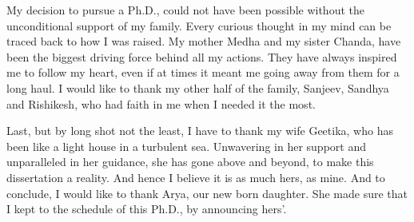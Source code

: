 \begin{acknowledgements}
My decision to pursue a Ph.D., could not have been possible without the unconditional support of my family. Every curious thought in my mind can be traced back to how I was raised. My mother Medha and my sister Chanda, have been the biggest driving force behind all my actions. They have always inspired me to follow my heart, even if at times it meant me going away from them for a long haul. I would like to thank my other half of the family, Sanjeev, Sandhya and Rishikesh, who had faith in me when I needed it the most.

Last, but by long shot not the least, I have to thank my wife Geetika, who has been like a light house in a turbulent sea. Unwavering in her support and unparalleled in her guidance, she has gone above and beyond, to make this dissertation a reality. And hence I believe it is as much hers, as mine. And to conclude, I would like to thank Arya, our new born daughter. She made sure that I kept to the schedule of this Ph.D., by announcing hers'. 
\end{acknowledgements}
